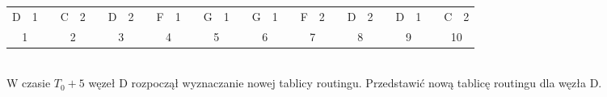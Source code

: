 \begin{tabular}{|c|c|c|c|c|c|c|c|c|c|c|c|c|c|c|c|c|c|c|c|c|c|c|c|c|c|c|c|c|}
				D          & 1          &  & C           & 2         &  & D          & 2         &  & F           & 1         &  & G           & 1         &  & G           & 1         &  & F           & 2         &  & D           & 2         &  & D           & 1         &  & C          & 2         \\ \cline{1-2} \cline{4-5} \cline{7-8} \cline{10-11} \cline{13-14} \cline{16-17} \cline{19-20} \cline{22-23} \cline{25-26} \cline{28-29}
				\multicolumn{2}{c}{1} &  & \multicolumn{2}{c}{2} &  & \multicolumn{2}{c}{3} &  & \multicolumn{2}{c}{4} &  & \multicolumn{2}{c}{5} &  & \multicolumn{2}{c}{6} &  & \multicolumn{2}{c}{7} &  & \multicolumn{2}{c}{8} &  & \multicolumn{2}{c}{9} &  & \multicolumn{2}{c}{10} \\ 
			\end{tabular}\\
			W czasie $ T_0+5 $ węzeł D rozpoczął wyznaczanie nowej tablicy routingu. Przedstawić nową tablicę routingu dla węzła D.
\newpage

